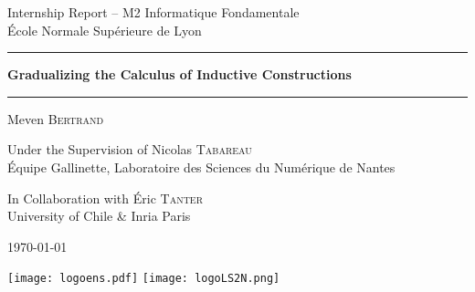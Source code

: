\documentclass{kaobook}
\date{\today}
\DeclareMathOperator{\?}{?}
\begin{document}
{
\thispagestyle{empty}
\raggedright
	
	{\Large Internship Report – M2 Informatique Fondamentale \\
	École Normale Supérieure de Lyon}
	
	
	{\rule{\linewidth}{0.5mm}
		\Huge\bfseries Gradualizing the Calculus of Inductive Constructions\\
	\rule{\linewidth}{0.5mm}
		\par}
	
	
	{\LARGE Meven \textsc{Bertrand}}
	
	
	{\Large Under the Supervision of Nicolas \textsc{Tabareau}}\\
	{\large Équipe Gallinette, Laboratoire des Sciences du Numérique de Nantes}
	
	
	{\Large In Collaboration with Éric \textsc{Tanter}}\\
	{\large University of Chile \& Inria Paris}
	
	
	{\Large\today}
	
	
	 \texttt{[image: logoens.pdf]}  \texttt{[image: logoLS2N.png]} 
	
	

}
\clearpage
\end{document}
